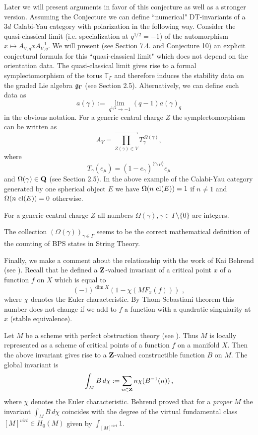 \documentclass[12pt]{article}
\begin{document}
Later we will present arguments in favor of this conjecture as well as a stronger version.
Assuming the Conjecture  we can define ``numerical" DT-invariants of a $3d$ Calabi-Yau category with polarization in the following way. Consider the quasi-classical limit (i.e. specialization at $q^{1/2}=-1$) of the automorphism $x\mapsto A_{V,q}xA_{V,q}^{-1}$.
We will present (see Section 7.4. and Conjecture 10) an explicit conjectural formula for this ``quasi-classical limit" which does not depend on the orientation data.
The quasi-classical limit gives rise to a formal symplectomorphism of the torus ${\mathbb T}_{\Gamma}$ and therefore induces 
 the stability data on the graded Lie algebra ${\mathfrak g}_{\Gamma}$ (see Section 2.5). Alternatively, we can define such data as
$$a(\gamma):=\lim_{q^{1/2}\to -1}(q-1)a(\gamma)_q$$
in the obvious notation.
For a generic central charge $Z$ the symplectomorphism can be written as
$$A_V=\prod_{Z(\gamma)\in V}^{\longrightarrow}T_{\gamma}^{\,\Omega(\gamma)},$$
where $$T_{\gamma}(e_{\mu})=(1-e_{\gamma})^{\langle \gamma,\mu\rangle}e_{\mu}$$ and $\Omega(\gamma)\in {\bf Q}$ (see Section 2.5). In the above example of the Calabi-Yau category generated by one spherical object $E$ we have $\Omega(n\,\operatorname{cl}(E))=1$ if $n\ne 1$ and $\Omega(n\,\operatorname{cl}(E))=0$ otherwise.

\begin{conj} For a generic central charge $Z$ all numbers $\Omega(\gamma),\gamma \in \Gamma\setminus \{0\}$ are integers.

\end{conj}

The collection $(\Omega(\gamma))_{\gamma \in \Gamma}$
seems to be the correct mathematical definition of the counting of BPS states in  String Theory.

Finally, we make a comment about the relationship with the work of Kai Behrend (see \cite{B}). Recall that he defined a ${\bf Z}$-valued invariant of a critical point $x$ of a function $f$ on $X$ which is equal to 
$$(-1)^{\dim X}(1-\chi(MF_x(f)))\,\,,$$ where $\chi$ denotes the Euler characteristic. By Thom-Sebastiani theorem this number does not change if we add to $f$ a function with a quadratic singularity at $x$ (stable equivalence).

Let $M$ be a scheme with perfect obstruction theory (see \cite{BF}). Thus $M$ is locally represented as a scheme of critical points of a function $f$ on a manifold $X$. Then the above invariant gives rise to a ${\bf Z}$-valued constructible function $B$ on $M$. The 
global invariant is
$$\int_MB\,d\chi:=\sum_{n\in {\bf Z}}n \chi(B^{-1}(n))\,,$$ where $\chi$ denotes the Euler characteristic. Behrend proved that for a {\it proper} $M$ the invariant $\int_M B\, d\chi$ coincides with the degree of the virtual fundamental class $[M]^{virt}\in H_0(M)$ given by $\int_{[M]^{virt}}1$.
\end{document}
